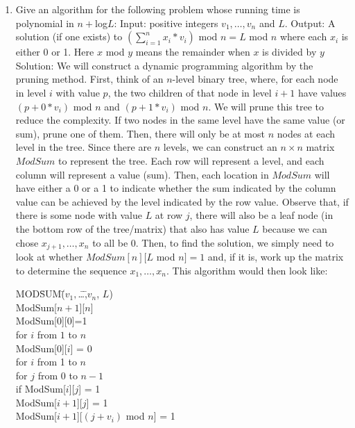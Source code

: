 \documentclass{article}
\begin{document}
\begin{enumerate}
\item Give an algorithm for the following problem whose running time is polynomial in $n+$log$L$:
\newline  Input: positive integers $v_{1},\ldots ,v_{n}$ and $L$.
\newline Output: A solution (if one exists) to $(\sum_{i=1}^{n}x_{i}*v_{i})$ mod $n = L$ mod $n$ where each $x_{i}$ is either 0 or 1.
Here $x$ mod $y$ means the remainder when $x$ is divided by $y$
\newline
\newline Solution: We will construct a dynamic programming algorithm by the pruning method. First, think of an $n$-level binary tree, where, for each node in level $i$ with value $p$, the two children of that node in level $i+1$ have values $(p+0*v_i)$ mod $n$ and $(p+1*v_i)$ mod $n$. We will prune this tree to reduce the complexity. If two nodes in the same level have the same value (or sum), prune one of them. Then, there will only be at most $n$ nodes at each level in the tree.  Since there are $n$ levels, we can construct an $n\times n$ matrix $ModSum$ to represent the tree. Each row will represent a level, and each column will represent a value (sum). Then, each location in $ModSum$ will have either a 0 or a 1 to indicate whether the sum indicated by the column value can be achieved by the level indicated by the row value. Observe that, if there is some node with value $L$ at row $j$, there will also be a leaf node (in the bottom row of the tree/matrix) that also has value $L$ because we can chose $x_{j+1},\ldots ,x_n$ to all be 0.  Then, to find the solution, we simply need to look at whether $ModSum[n][L$ mod $n]=1$ and, if it is, work up the matrix to determine the sequence $x_1,\ldots ,x_n$. This algorithm would then look like:
\begin{tabbing}
MOD\= SUM\= ($v_1,$\= \ldots \= ,$v_n$, $L$)\\
\>ModSum[$n+1$][$n$]\\
\>ModSum[0][0]=1\\
\>for $i$ from $1$ to $n$\\
\>\>ModSum[0][$i$] = 0\\
\>for $i$ from 1 to $n$\\
\>\>for $j$ from 0 to $n-1$\\
\>\>\>if ModSum[$i$][$j$] = 1\\
\>\>\>\>ModSum[$i+1$][$j$] = 1\\
\>\>\>\>ModSum[$i+1$][$(j+v_i)$ mod $n$] = 1\\

\end{tabbing}
\end{enumerate}
\end{document}
